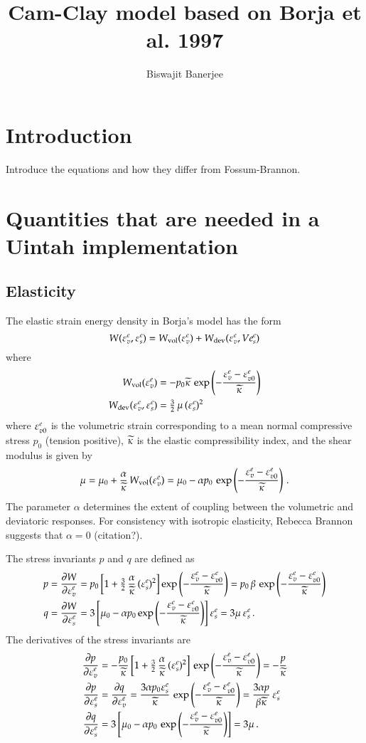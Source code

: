 \documentclass[twoside,10pt,a4paper]{article}
\begin{document}

\title{Cam-Clay model based on Borja et al. 1997}
\author{Biswajit Banerjee}
\maketitle
\tableofcontents
\newpage

\section{Introduction}
Introduce the equations and how they differ from Fossum-Brannon.

\section{Quantities that are needed in a Uintah implementation}
\subsection{Elasticity}
The elastic strain energy density in Borja's model has the form
\[
  W(\Ve^e_v,\Ve^e_s) = W_\Tvol(\Ve^e_v) + W_\Tdev(\Ve^e_v, Ve^e_s)
\]
where
\[
   \Bal
    W_\Tvol(\Ve^e_v) & = -p_0\kappatilde\,\exp\left(-\frac{\Ve^e_v - \Ve^e_{v0}}{\kappatilde}\right) \\
    W_\Tdev(\Ve^e_v,\Ve^e_s) & =  \tfrac{3}{2}\,\mu\,(\Ve^e_s)^2
   \Eal
\]
where $\Ve^e_{v0}$ is the volumetric strain corresponding to a mean normal compressive stress $p_0$ 
(tension positive), $\kappatilde$ is the elastic compressibility index, and the shear modulus is given by
\[
  \mu = \mu_0 + \frac{\alpha}{\kappatilde}\,W_\Tvol(\Ve^e_v) 
      = \mu_0 - \alpha p_0\,\exp\left(-\frac{\Ve^e_v - \Ve^e_{v0}}{\kappatilde}\right) \,.
\]
The parameter $\alpha$ determines the extent of coupling between the volumetric and deviatoric 
responses.  For consistency with isotropic elasticity, Rebecca Brannon suggests that $\alpha = 0$ (citation?). 

The stress invariants $p$ and $q$ are defined as
\[
  \Bal
    p &= \Partial{W}{\Ve^e_v} = p_0\left[1 + \tfrac{3}{2}\,\frac{\alpha}{\kappatilde}\,(\Ve^e_s)^2\right]
         \exp\left(-\frac{\Ve^e_v - \Ve^e_{v0}}{\kappatilde}\right) 
       = p_0\,\beta\,\exp\left(-\frac{\Ve^e_v - \Ve^e_{v0}}{\kappatilde}\right) \\
    q &= \Partial{W}{\Ve^e_s} = 3\left[\mu_0 - \alpha p_0\exp\left(-\frac{\Ve^e_v - \Ve^e_{v0}}{\kappatilde}\right) 
         \right]\Ve^e_s  = 3\mu\,\Ve^e_s\,.
  \Eal
\]
The derivatives of the stress invariants are
\[
  \Bal
    \Partial{p}{\Ve^e_v} & = -\frac{p_0}{\kappatilde}
         \left[1 + \tfrac{3}{2}\,\frac{\alpha}{\kappatilde}\,(\Ve^e_s)^2\right]
         \,\exp\left(-\frac{\Ve^e_v - \Ve^e_{v0}}{\kappatilde}\right) 
        = -\frac{p}{\kappatilde} \\
    \Partial{p}{\Ve^e_s} & = \Partial{q}{\Ve^e_v} = \frac{3\alpha p_0 \Ve^e_s}{\kappatilde}
         \,\exp\left(-\frac{\Ve^e_v - \Ve^e_{v0}}{\kappatilde}\right) = \frac{3\alpha p}{\beta \kappatilde}\,\Ve^e_s \\
    \Partial{q}{\Ve^e_s} & = 3 \left[\mu_0 - \alpha p_0
         \,\exp\left(-\frac{\Ve^e_v - \Ve^e_{v0}}{\kappatilde}\right) \right] = 3 \mu\,.
  \Eal
\]
\end{document}
